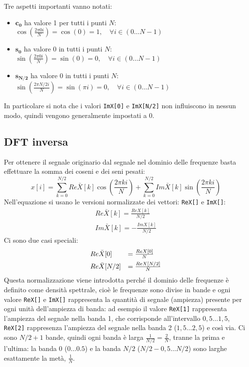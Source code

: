Tre aspetti importanti vanno notati:
\begin{itemize}
	\item $\boldsymbol{c_0}$ ha valore 1 per tutti i punti $N$:
		$\cos\left(\frac{2\pi 0i}{N}\right) = \cos(0) = 1, \quad \forall i \in
		(0 \dots N-1)$
	\item $\boldsymbol{s_0}$ ha valore 0 in tutti i punti $N$:
		$\sin\left(\frac{2\pi 0i}{N}\right) = \sin(0) = 0, \quad \forall i \in
		(0 \dots N-1)$
	\item $\boldsymbol{s_{N/2}}$ ha valore 0 in tutti i punti $N$:
		$\sin\left(\frac{2\pi N/2i}{N}\right) = \sin(\pi i) = 0, \quad \forall i \in
		(0 \dots N-1)$
\end{itemize}

In particolare si nota che i valori \texttt{ImX[0]} e \texttt{ImX[N/2]} non
influiscono in nessun modo, quindi vengono generalmente impostati a 0. 

\subsection{DFT inversa}
Per ottenere il segnale originario dal segnale nel dominio delle frequenze basta
effettuare la somma dei coseni e dei seni pesati:
\[
x[i] = \sum_{k=0}^{N/2} Re\bar{X}[k] \cos\left(\frac{2\pi ki}{N}\right) +
\sum_{k=0}^{N/2} Im\bar{X}[k] \sin\left(\frac{2\pi ki}{N}\right)
\]
Nell'equazione si usano le versioni normalizzate dei vettori:
\texttt{ReX[]} e \texttt{ImX[]}:
\[
\begin{array}{l}
	Re\bar{X}[k] = \frac{ReX[k]}{N/2}\\[0.5em]
	Im\bar{X}[k] = -\frac{ImX[k]}{N/2}
\end{array}
\]
Ci sono due casi speciali:
\[
\begin{array}{l l}
	Re\bar{X}[0] & = \frac{ReX[0]}{N} \\[0.5em]
	Re\bar{X}[N/2] & = \frac{ReX[N/2]}{N}
\end{array}
\]
Questa normalizzazione viene introdotta perch\'e il dominio delle frequenze \`e
definito come densit\`a spettrale, cio\`e le frequenze sono divise in bande e
ogni valore \texttt{ReX[]} e \texttt{ImX[]} rappresenta la quantit\`a di segnale
(ampiezza) presente per ogni unit\`a dell'ampiezza di banda: ad esempio il
valore \texttt{ReX[1]} rappresenta l'ampiezza del segnale nella banda 1, che
corrisponde all'intervallo $0,5\dots1,5$, \texttt{ReX[2]} rappresenza l'ampiezza
del segnale nella banda 2 ($1,5\dots2,5$) e cos\`i via. Ci sono $N/2+1$ bande,
quindi ogni banda \`e larga $\frac{1}{N/2} = \frac{2}{N}$, tranne la prima e
l'ultima: la banda 0 ($0\dots 0.5$) e la banda $N/2$ ($N/2-0,5\dots N/2$) sono
larghe esattamente la met\`a, $\frac{1}{N}$.

